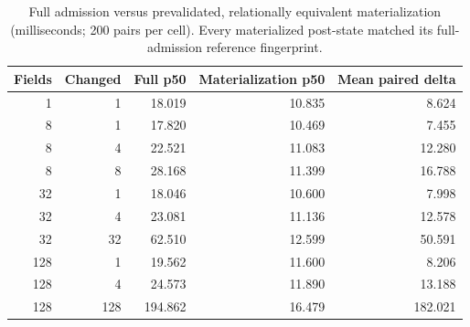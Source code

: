 \begin{table}[t]
\centering
\caption{Full admission versus prevalidated, relationally equivalent materialization (milliseconds; 200 pairs per cell). Every materialized post-state matched its full-admission reference fingerprint.}
\label{tab:feature-baseline}
\small
\begin{tabular}{rrrrr}
\toprule
Fields & Changed & Full p50 & Materialization p50 & Mean paired delta \\
\midrule
1   & 1   & 18.019 & 10.835 & 8.624 \\
8   & 1   & 17.820 & 10.469 & 7.455 \\
8   & 4   & 22.521 & 11.083 & 12.280 \\
8   & 8   & 28.168 & 11.399 & 16.788 \\
32  & 1   & 18.046 & 10.600 & 7.998 \\
32  & 4   & 23.081 & 11.136 & 12.578 \\
32  & 32  & 62.510 & 12.599 & 50.591 \\
128 & 1   & 19.562 & 11.600 & 8.206 \\
128 & 4   & 24.573 & 11.890 & 13.188 \\
128 & 128 & 194.862 & 16.479 & 182.021 \\
\bottomrule
\end{tabular}
\end{table}

